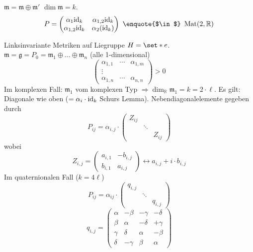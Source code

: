 \begin{beispiel*}[{name=[Gestalt von $P$ für Zerlegung in zwei Summanden]}]
	$\mathfrak{m} = \mathfrak{m} \oplus \mathfrak{m}'$ $\dim \mathfrak{m} = k$.
	\[
		P = \begin{pmatrix}
			\alpha_1 {\id_k} & \alpha_{1,2} {\id_k} \\
			\alpha_{1,2} {\id_k} & \alpha_2 (\id_k)
		\end{pmatrix}
		\text{ \enquote{$\in$} } \Mat(2,\mathbb{R})
	\]
\end{beispiel*}

Linksinvariante Metriken auf Liegruppe $H=\set*{e}$. $\mathfrak{m} = \mathfrak{g} = P_0 = \mathfrak{m}_1 \oplus \ldots \oplus \mathfrak{m}_n$ (alle 1-dimensional)
\[
	\begin{pmatrix}
		\alpha_{1,1} & \cdots & \alpha_{1,m} \\
		\vdots & & \\
		\alpha_{1,n} & \cdots & \alpha_{n,n}
	\end{pmatrix} > 0
\]
Im komplexen Fall: $\mathfrak{m}_1$ vom komplexen Typ $\Rightarrow \dim_\mathbb{R} \mathfrak{m}_1 = k = 2 \cdot \ell$.
Es gilt: Diagonale wie oben ($= \alpha_i \cdot {\operatorname{id}_k}$ Schurs Lemma). 
Nebendiagonalelemente gegeben durch 
\[
	P_{ij} = \alpha_{i,j} \cdot \begin{pmatrix}
		Z_{ij} & & \\
		& \ddots & \\
		& & Z_{ij}
	\end{pmatrix}
\]
wobei
\[
	Z_{i,j} = \begin{pmatrix}
		a_{i,1}  & -b_{i,j} \\
		b_{i,1} & a_{i,j}
	\end{pmatrix} \longleftrightarrow a_{i,j} + i \cdot b_{i,j}
\]
Im quaternionalen Fall ($k=4 \ell$)
\[
	P_{ij} = \alpha_{ij} \cdot \begin{pmatrix}
		q_{i,j} & & \\
		& \ddots & \\
		& & q_{i,j}
	\end{pmatrix}
\]
\[
	q_{i,j} = \begin{pmatrix}
		\alpha & -\beta & - \gamma & - \delta \\
		\beta & \alpha & - \delta & + \gamma \\
		\gamma & \delta & \alpha & - \beta \\
		\delta & -\gamma & \beta & \alpha
	\end{pmatrix}
\]

